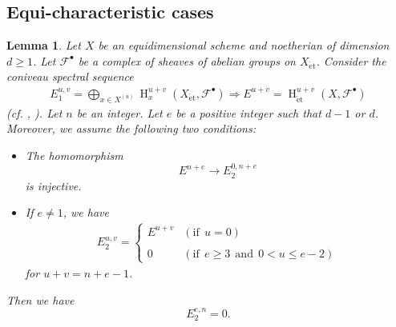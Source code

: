 \documentclass{article}
\newtheorem{lem}[thm]{\indent \sc Lemma}
\newcommand{\et}{\mathrm{\acute{e}t}}
\newcommand{\HO}{\operatorname{H}}
\begin{document}
%
\subsection{Equi-characteristic cases}
%
\begin{lem}\upshape\label{Spbor}
Let $X$ be an equidimensional scheme and
noetherian of dimension $d\geq 1$.
Let $\mathcal{F}^{\bullet}$ be a complex of sheaves of abelian groups on $X_{\et}$.
Consider the coniveau spectral sequence
%
\begin{align}\label{cosp}
E^{u, v}_{1} 
=
\bigoplus_{x\in X^{(u)}}
\HO_{x}^{u+v}(
X_{\et},
\mathcal{F}^{\bullet}
)
\Rightarrow
E^{u+v}
=
\HO^{u+v}_{\et}(
X,
\mathcal{F}^{\bullet}
)
\end{align}
%
(cf. \cite[Part 1, \S 1]{C-H-K}, \cite[Theorem 2.1]{Sak5}). 
Let $n$ be an integer. Let  $e$ be a positive integer such that $d-1$ or $d$. 
Moreover, we assume the following two conditions:
%
\begin{itemize}
%
\item[(a)] The homomorphism
%
\begin{equation*}
E^{n+e}
\to
E_{2}^{0, n+e}
\end{equation*}
%
is injective.
%
\item[(b)] If $e\neq 1$, we have
%
\begin{align*}
E^{u, v}_{2}
=
%
\begin{cases}
E^{u+v}
& (\textrm{if}~~u=0) \\
\\
0
& (\textrm{if}~~e\geq 3~~\textrm{and}~~0<u\leq e-2)
\end{cases}
%
\end{align*}
%
for $u+v=n+e-1$.
\end{itemize}
%
Then we have
%
\begin{equation*}
E_{2}^{e, n}
=0.    
\end{equation*}
%
\end{lem}
%
\end{document}
